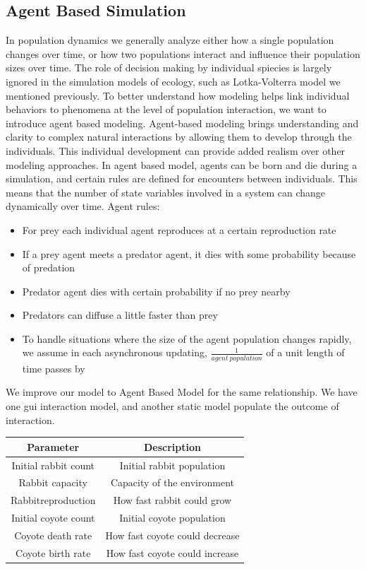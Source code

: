 \documentclass{article}
\begin{document}
\begin{normalsize}
		\subsection{Agent Based Simulation}
		In population dynamics we generally analyze either how a single population changes over time, or how two populations interact and influence their population sizes over time. The role of decision making by individual spiecies is largely ignored in the simulation models of ecology, such as Lotka-Volterra model we mentioned previously. To better understand how modeling helps link individual behaviors to phenomena at the level of population interaction, we want to  introduce agent based modeling.
		 Agent-based modeling brings understanding and clarity to complex natural interactions by allowing them to develop through the individuals. This individual development can provide added realism over other modeling approaches. In agent based model,
		agents can be born and die during a simulation, and certain rules are defined for encounters between individuals. This means that the number of state variables involved in a system can change dynamically over time.
		Agent rules:
		\begin{itemize}
		    \item For prey each individual agent reproduces at a certain reproduction rate
		    \item If a prey agent meets a predator agent, it dies with some probability because of predation
		    \item Predator agent  dies with certain probability if no prey nearby
		    \item Predators can diffuse a little faster than prey
		    \item To handle situations where the size of the agent population changes rapidly, we assume in each asynchronous updating,
$\frac{1}{agent\ population}$ of a unit length of time passes by
		\end{itemize}
		
		We improve our model to Agent Based Model for the same relationship. We have one gui interaction model, and another static model populate the outcome of interaction.
		
			\begin{center}
			\begin{tabular}{ |c|c|} 
				\hline
				Parameter & Description  \\ 
				\hline
				Initial rabbit count & Initial rabbit population  \\ 
				Rabbit capacity & Capacity of the environment\\ 
				Rabbitreproduction & How fast rabbit could grow \\ 
				Initial coyote count & Initial coyote population \\ 
				Coyote death rate & How fast coyote could decrease \\ 
				Coyote birth rate  & How fast coyote could increase \\ 
				\hline
			\end{tabular}
		\end{center}
		

\end{normalsize}
\end{document}
